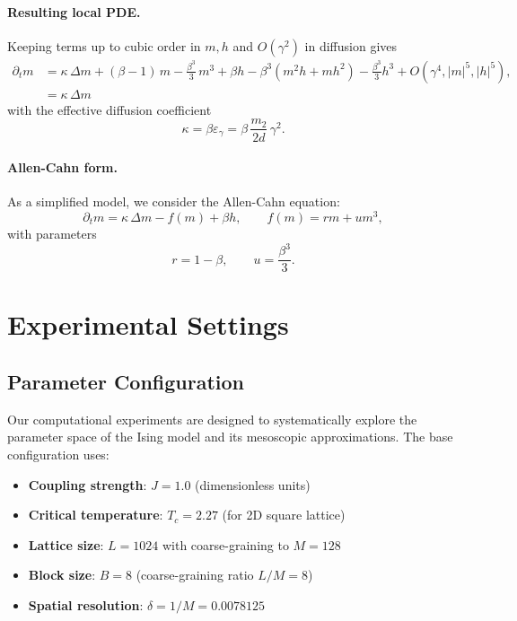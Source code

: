 \documentclass[11pt,a4paper]{article}
\begin{document}
\paragraph{Resulting local PDE.}
Keeping terms up to cubic order in $m,h$ and $O(\gamma^2)$ in diffusion gives
\begin{equation}
     \begin{split}
    \label{eq:local}
\partial_t m
& = \kappa\, \Delta m 
+ (\beta - 1)\, m - \frac{\beta^3}{3}\, m^3 + \beta h
- \beta^3(m^2 h + m h^2) - \frac{\beta^3}{3} h^3
+ O(\gamma^4, |m|^5, |h|^5),\\
& = \kappa\, \Delta m 
        \end{split}
\end{equation}
with the effective diffusion coefficient
\begin{equation}
\kappa = \beta \varepsilon_\gamma = \beta\, \frac{m_2}{2d}\, \gamma^2.
\end{equation}


\paragraph{Allen-Cahn form.}
As a simplified model, we consider the Allen-Cahn equation:
\begin{equation}
    \label{eq:allen-cahn}
\partial_t m = \kappa\, \Delta m - f(m) + \beta h,
\qquad
f(m) = r m + u m^3,
\end{equation}
with parameters
\begin{equation}
r = 1-\beta, 
\qquad u = \frac{\beta^3}{3}.
\end{equation}



\section{Experimental Settings}

\subsection{Parameter Configuration}

Our computational experiments are designed to systematically explore the parameter space of the Ising model and its mesoscopic approximations. The base configuration uses:

\begin{itemize}
    \item \textbf{Coupling strength}: $J = 1.0$ (dimensionless units)
    \item \textbf{Critical temperature}: $T_c = 2.27$ (for 2D square lattice)
    \item \textbf{Lattice size}: $L = 1024$ with coarse-graining to $M = 128$
    \item \textbf{Block size}: $B = 8$ (coarse-graining ratio $L/M = 8$)
    \item \textbf{Spatial resolution}: $\delta = 1/M = 0.0078125$
\end{itemize}
\end{document}
